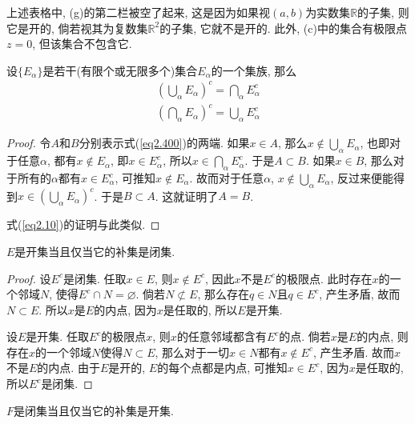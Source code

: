 \documentclass[cn,12pt,math=mtpro2,citestyle=gb7714-2015,bibstyle=gb7714-2015,twocol]{elegantbook}
\newcommand{\R}{\mathbb{R}}
\let\emptyset\varnothing
\begin{document}
\begin{remark}
上述表格中, (g)的第二栏被空了起来, 这是因为如果视$(a,b)$为实数集$\R$的子集, 则它是开的, 倘若视其为复数集$\R^2$的子集, 它就不是开的. 此外, (c)中的集合有极限点$z=0$, 但该集合不包含它.
\end{remark}

\begin{theorem}[De Morgan律]
  设$\{E_\alpha\}$是若干(有限个或无限多个)集合$E_\alpha$的一个集族, 那么
  \begin{align}
  \left(\bigcup_\alpha E_\alpha\right)^c=\bigcap_\alpha E_\alpha^c \label{eq2.400} \\
  \left(\bigcap_\alpha E_\alpha\right)^c=\bigcup_\alpha E_\alpha^c \label{eq2.10}
  \end{align}
\end{theorem}
\begin{proof}
  令$A$和$B$分别表示式(\ref{eq2.400})的两端. 如果$x\in A$, 那么$x\notin \bigcup_\alpha E_\alpha$, 也即对于任意$\alpha$, 都有$x\notin E_\alpha$, 即$x \in E_\alpha^c$, 所以$ x\in\bigcap_\alpha E_\alpha^c$. 于是$A\subset B$. 如果$x\in B$, 那么对于所有的$ \alpha$都有$x\in E_\alpha^c$, 可推知$x\notin E_\alpha$. 故而对于任意$\alpha$, $ x \notin \bigcup_\alpha E_\alpha$, 反过来便能得到$ x\in \left(\bigcup_\alpha E_\alpha\right)^c$. 于是$B\subset A$. 这就证明了$A=B$.

  式(\ref{eq2.10})的证明与此类似.

\end{proof}
\begin{theorem}\label{thm:th2.3}
  $E$是开集当且仅当它的补集是闭集.
\end{theorem}
\begin{proof}
  设$E^c$是闭集. 任取$x\in E$, 则$x \notin E^c$, 因此$x$不是$E^c$的极限点. 此时存在$x$的一个邻域$N$, 使得$E^c\cap N=\emptyset$. 倘若$N\not\subset E$, 那么存在$q\in N$且$q \in E^c$, 产生矛盾, 故而$N\subset E$. 所以$x$是$E$的内点, 因为$x$是任取的, 所以$E$是开集.

  设$E$是开集. 任取$E^c$的极限点$x$, 则$x$的任意邻域都含有$E^c$的点. 倘若$x$是$E$的内点, 则存在$x$的一个邻域$N$使得$N\subset E$, 那么对于一切$x\in N$都有$x \notin E^c$, 产生矛盾. 故而$x$不是$E$的内点. 由于$E$是开的, $E$的每个点都是内点, 可推知$x\in E^c$, 因为$x$是任取的, 所以$E^c$是闭集.


\end{proof}
\begin{corollary}
$F$是闭集当且仅当它的补集是开集.
\end{corollary}
\end{document}
